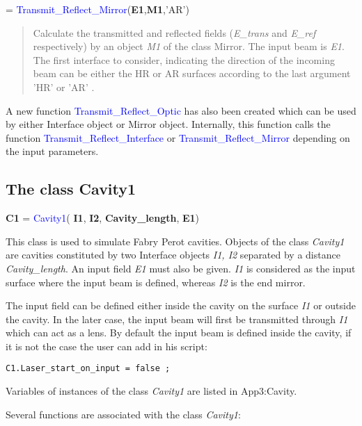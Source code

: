 = \textcolor{blue}{Transmit\_Reflect\_Mirror}(\textbf{E1},\textbf{M1},'AR')
\vspace*{-0.2cm}
\begin{quote}
Calculate the transmitted and reflected fields (\textsl{E\_trans} and \textsl{E\_ref} respectively) by an object \textsl{M1} of the class Mirror. The input beam is \textsl{E1}. The first interface to consider, indicating the direction of the incoming beam can be either the HR or AR surfaces according to the last argument 'HR' or 'AR' .
\end{quote}

A new function \textcolor{blue}{Transmit\_Reflect\_Optic} has also been created which can be used by either Interface object or Mirror object. Internally, this function calls the function \textcolor{blue}{Transmit\_Reflect\_Interface} or \textcolor{blue}{Transmit\_Reflect\_Mirror} depending on the input parameters.

\subsection{The class Cavity1}
\textbf{C1} = \textcolor{blue}{Cavity1}( \textbf{I1}, \textbf{I2}, \textbf{Cavity\_length}, \textbf{E1})

This class is used to simulate Fabry Perot cavities. Objects of the class \textsl{Cavity1} are cavities constituted by two Interface objects \textsl{I1, I2} separated by a distance \textsl{Cavity\_length}. An input field \textsl{E1} must also be given. \textsl{I1} is considered as the input surface where the input beam is defined, whereas \textsl{I2} is the end mirror.

The input field can be defined either inside the cavity on the surface \textsl{I1} or outside the cavity. In the later case, the input beam will first be transmitted through \textsl{I1} which can act as a lens. By default the input beam is defined inside the cavity, if it is not the case the user can add in his script:
\begin{verbatim}
C1.Laser_start_on_input = false ;
\end{verbatim}

Variables of instances of the class \textsl{Cavity1} are listed in {App3:Cavity}.

\noindent Several functions are associated with the class \textsl{Cavity1}:

